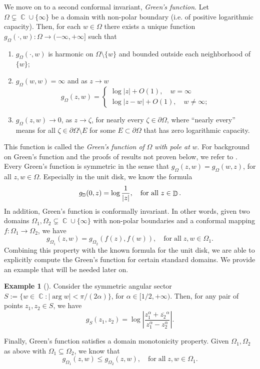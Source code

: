 \documentclass[11pt]{amsart}
\numberwithin{equation}{section}
\theoremstyle{definition}
\newtheorem{example}[theorem]{Example}
\DeclareMathOperator{\C}{\mathbb{C}}
\DeclareMathOperator{\D}{\mathbb{D}}
\begin{document}
	We move on to a second conformal invariant, \textit{Green's function}. Let $\Omega\subsetneq\C\cup\{\infty\}$ be a domain with non-polar boundary (i.e. of positive logarithmic capacity). Then, for each $w\in\Omega$ there exists a unique function $g_\Omega(\cdot,w):\Omega\to(-\infty,+\infty]$ such that
	\begin{enumerate}
		\item[(i)] $g_\Omega(\cdot,w)$ is harmonic on $\Omega\setminus\{w\}$ and bounded outside each neighborhood of $\{w\}$;
		\item[(ii)] $g_\Omega(w,w)=\infty$ and as $z\to w$
		$$g_\Omega(z,w)= \begin{cases}
			\log|z|+O(1),\quad w=\infty\\
			\log|z-w|+O(1), \quad w\ne\infty;
		\end{cases}$$
		\item[(iii)] $g_\Omega(z,w)\to 0$, as $z\to\zeta$, for nearly every $\zeta\in\partial\Omega$, where ``nearly every'' means for all $\zeta\in\partial\Omega\setminus E$ for some $E\subset\partial\Omega$ that has zero logarithmic capacity.
	\end{enumerate}
	This function is called the \textit{Green's function of} $\Omega$ \textit{with pole at} $w$. For background on Green's function and the proofs of results not proven below, we refer to \cite[Section 4.4]{Ransford}. Every Green's function is symmetric in the sense that $g_\Omega(z,w)=g_\Omega(w,z)$, for all $z,w\in\Omega$. Especially in the unit disk, we know the formula
	\begin{equation}\label{eq:green unit disk}
		g_{\D}(0,z)=\log\dfrac{1}{|z|}, \quad \textup{for all }z\in\D.
	\end{equation}
	In addition, Green's function is conformally invariant. In other words, given two domains $\Omega_1,\Omega_2\subsetneq\C\cup\{\infty\}$ with non-polar boundaries and a conformal mapping $f:\Omega_1\to\Omega_2$, we have
	\begin{equation}\label{eq:green invariance}
		g_{\Omega_1}(z,w)=g_{\Omega_2}(f(z),f(w)), \quad\mathrm{for \; all\;}z,w\in\Omega_1.
	\end{equation}
	Combining this property with the known formula for the unit disk, we are able to explicitly compute the Green's function for certain standard domains. We provide an example that will be needed later on.
	\begin{example}[{\cite[p.109]{Ransford}}]\label{ex:green sector}
		Consider the symmetric angular sector $S:=\{w\in\C:|\arg w|<\pi/(2\alpha)\}$, for $\alpha\in[1/2,+\infty)$. Then, for any pair of points $z_1,z_2\in S$, we have
		\begin{equation*}
			g_S(z_1,z_2)=\log\left|\dfrac{z_1^\alpha+\overline{z_2}^\alpha}{z_1^\alpha-z_2^\alpha}\right|.
		\end{equation*}
	\end{example}
	Finally, Green's function satisfies a domain monotonicity property. Given $\Omega_1,\Omega_2$ as above with $\Omega_1\subseteq\Omega_2$, we know that
	\begin{equation}\label{eq:green monotonicity}
		g_{\Omega_1}(z,w)\le g_{\Omega_2}(z,w), \quad\mathrm{for \; all\;}z,w\in\Omega_1.
	\end{equation}
	
\end{document}
